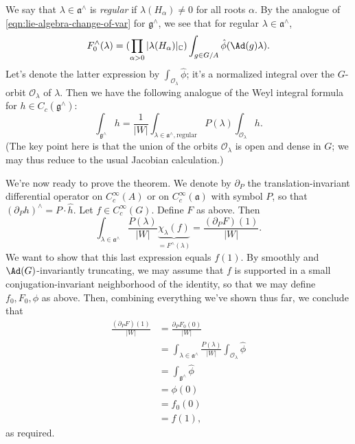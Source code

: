 \documentclass[reqno]{amsart} 
\begin{document}
We say that $\lambda \in \mathfrak{a}^\wedge$ is \emph{regular} if $\lambda(H_\alpha) \neq 0$ for all roots $\alpha$.  By the analogue of \eqref{eqn:lie-algebra-change-of-var} for $\mathfrak{g}^\wedge$, we see that for regular $\lambda \in \mathfrak{a}^\wedge$,
\begin{equation}\label{eqn:}
  F_0^\wedge(\lambda)
  = (\prod_{\alpha > 0}
  |\lambda(H_\alpha)|_{\mathbb{C}})
  \int_{g \in G/A}
  \hat{\phi}(\Ad(g) \lambda).
\end{equation}
Let's denote the latter expression by $\int_{\mathcal{O}_\lambda} \hat{\phi}$; it's a normalized integral over the $G$-orbit $\mathcal{O}_\lambda$ of $\lambda$.  Then we have the following analogue of the Weyl integral formula for $h \in C_c(\mathfrak{g}^\wedge)$:
\begin{equation}\label{eqn:}
  \int_{\mathfrak{g}^\wedge}
  h
  = \frac{1}{|W|}
  \int_{\lambda \in \mathfrak{a}^\wedge,\text{regular}}
  P(\lambda)
  \int_{\mathcal{O}_\lambda} h.
\end{equation}
(The key point here is that the union of the orbits $\mathcal{O}_\lambda$ is open and dense in $G$; we may thus reduce to the usual Jacobian calculation.)

We're now ready to prove the theorem.  We denote by $\partial_P$ the translation-invariant differential operator on $C_c^\infty(A)$ or on $C_c^\infty(\mathfrak{a})$ with symbol $P$, so that $(\partial_P h)^\wedge = P \cdot \hat{h}$.  Let $f \in C_c^\infty(G)$.  Define $F$ as above.  Then
\begin{equation}\label{eqn:}
  \int_{\lambda \in \mathfrak{a}^\wedge}
  \frac{P(\lambda)}{|W|}
  \underbrace{\chi_\lambda(f)}_{=F^\wedge(\lambda)}
  =
  \frac{(\partial_P F)(1)}{|W|}.
\end{equation}
We want to show that this last expression equals $f(1)$.  By smoothly and $\Ad(G)$-invariantly truncating, we may assume that $f$ is supported in a small conjugation-invariant neighborhood of the identity, so that we may define $f_0,F_0,\phi$ as above.  Then, combining everything we've shown thus far, we conclude that
\begin{align}\label{eqn:}
  \frac{(\partial_P F)(1)}{|W|}
  &=
    \frac{\partial_P F_0(0)}{|W|}
  \\
  &=
    \int_{\lambda \in \mathfrak{a}^\wedge}
    \frac{P(\lambda)}{|W|}
    \int_{\mathcal{O}_\lambda}
    \hat{\phi}
  \\
  &= \int_{\mathfrak{g}^\wedge}
    \hat{\phi}
  \\
  &=
    \phi(0)
  \\
  &= f_0(0)
  \\
  &= f(1),
\end{align}
as required.
\end{document}

